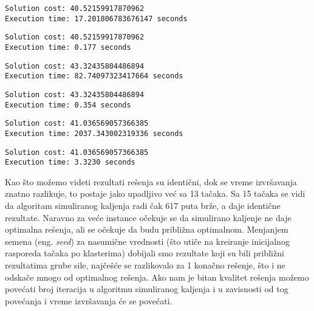 \documentclass[a4paper]{article}
\begin{document}
\begin{lstlisting}[title=Izlaz za algoritam grube sile za 12 tačaka i 4 klastera]
Solution cost: 40.52159917870962
Execution time: 17.201806783676147 seconds
\end{lstlisting}

\begin{lstlisting}[title=Izlaz za algoritam simuliranog kaljenja za 12 tačaka i 4 klastera]
Solution cost: 40.52159917870962
Execution time: 0.177 seconds
\end{lstlisting}


\begin{lstlisting}[title=Izlaz za algoritam grube sile za 13 tačaka i 4 klastera]
Solution cost: 43.32435804486894
Execution time: 82.74097323417664 seconds
\end{lstlisting}

\begin{lstlisting}[title=Izlaz za algoritam simuliranog kaljenja za 13 tačaka i 4 klastera]
Solution cost: 43.32435804486894
Execution time: 0.354 seconds
\end{lstlisting}


\begin{lstlisting}[title=Izlaz za algoritam grube sile za 15 tačaka i 4 klastera]
Solution cost: 41.036569057366385
Execution time: 2037.343002319336 seconds
\end{lstlisting}


\begin{lstlisting}[title=Izlaz za algoritam simuliranog kaljenja za 15 tačaka i 4 klastera]
Solution cost: 41.036569057366385
Execution time: 3.3230 seconds
\end{lstlisting}


Kao što možemo videti rezultati rešenja su identični, dok se vreme izvršavanja znatno razlikuje, to postaje jako upadljivo već sa 13 tačaka. Sa 15 tačaka se vidi da algoritam simuliranog kaljenja radi čak 617 puta brže, a daje identične rezultate. Naravno za veće instance očekuje se da simulirano kaljenje ne daje optimalna rešenja, ali se očekuje da budu približna optimalnom.
Menjanjem semena (eng. \textit{seed}) za nasumične vrednosti (što utiče na kreiranje inicijalnog rasporeda tačaka po klasterima) dobijali smo rezultate koji su bili približni rezultatima grube sile, najčešće se razlikovalo za 1 konačno rešenje, što i ne odskače mnogo od optimalnog rešenja. Ako nam je bitan kvalitet rešenja možemo povećati broj iteracija u algoritmu simuliranog kaljenja i u zavisnosti od tog povećanja i vreme izvršavanja će se povećati.
\end{document}
